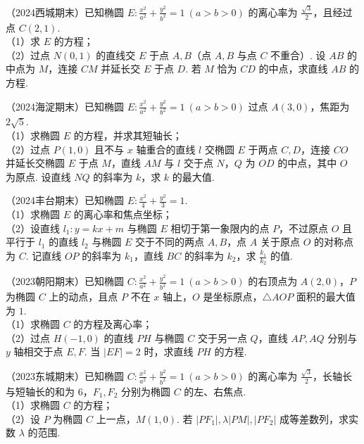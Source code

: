 \begin{example} %
（2024西城期末）已知椭圆 $E:\frac{x^2}{a^2}+\frac{y^2}{b^2}=1\ (a>b>0)$ 的离心率为 $\frac{\sqrt{3}}{2}$，且经过点 $C(2,1)$.\\
（1）求 $E$ 的方程；\\
（2）过点 $N(0,1)$ 的直线交 $E$ 于点 $A,B$（点 $A,B$ 与点 $C$ 不重合）. 设 $AB$ 的中点为 $M$，连接 $CM$ 并延长交 $E$ 于点 $D$. 若 $M$ 恰为 $CD$ 的中点，求直线 $AB$ 的方程.
\end{example}

\begin{example} %
（2024海淀期末）已知椭圆 $E:\frac{x^2}{a^2}+\frac{y^2}{b^2}=1\ (a>b>0)$ 过点 $A(3,0)$，焦距为 $2\sqrt{5}$.\\
（1）求椭圆 $E$ 的方程，并求其短轴长；\\
（2）过点 $P(1,0)$ 且不与 $x$ 轴重合的直线 $l$ 交椭圆 $E$ 于两点 $C,D$，连接 $CO$ 并延长交椭圆 $E$ 于点 $M$，直线 $AM$ 与 $l$ 交于点 $N$，$Q$ 为 $OD$ 的中点，其中 $O$ 为原点. 设直线 $NQ$ 的斜率为 $k$，求 $k$ 的最大值.
\end{example}

\begin{example} %
（2024丰台期末）已知椭圆 $E:\frac{x^2}{4}+\frac{y^2}{3}=1$.\\
（1）求椭圆 $E$ 的离心率和焦点坐标；\\
（2）设直线 $l_1:y=kx+m$ 与椭圆 $E$ 相切于第一象限内的点 $P$，不过原点 $O$ 且平行于 $l_1$ 的直线 $l_2$ 与椭圆 $E$ 交于不同的两点 $A,B$，点 $A$ 关于原点 $O$ 的对称点为 $C$. 记直线 $OP$ 的斜率为 $k_1$，直线 $BC$ 的斜率为 $k_2$，求 $\frac{k_1}{k_2}$ 的值.
\end{example}

\begin{example} %
（2023朝阳期末）已知椭圆 $C:\frac{x^2}{a^2}+\frac{y^2}{b^2}=1\ (a>b>0)$ 的右顶点为 $A(2,0)$，$P$ 为椭圆 $C$ 上的动点，且点 $P$ 不在 $x$ 轴上，$O$ 是坐标原点，$\triangle AOP$ 面积的最大值为 $1$.\\
（1）求椭圆 $C$ 的方程及离心率；\\
（2）过点 $H(-1,0)$ 的直线 $PH$ 与椭圆 $C$ 交于另一点 $Q$，直线 $AP,AQ$ 分别与 $y$ 轴相交于点 $E,F$. 当 $\lvert EF\rvert=2$ 时，求直线 $PH$ 的方程.
\end{example}

\begin{example} %
（2023东城期末）已知椭圆 $C:\frac{x^2}{a^2}+\frac{y^2}{b^2}=1\ (a>b>0)$ 的离心率为 $\frac{\sqrt{3}}{2}$，长轴长与短轴长的和为 $6$，$F_1,F_2$ 分别为椭圆 $C$ 的左、右焦点.\\
（1）求椭圆 $C$ 的方程；\\
（2）设 $P$ 为椭圆 $C$ 上一点，$M(1,0)$. 若 $\lvert PF_1\rvert,\lambda\lvert PM\rvert,\lvert PF_2\rvert$ 成等差数列，求实数 $\lambda$ 的范围.
\end{example}

